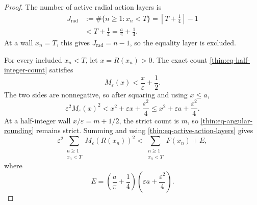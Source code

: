 \documentclass[11pt]{article}
\numberwithin{equation}{section}
\theoremstyle{definition}
\theoremstyle{remark}
\begin{document}
\begin{proof}
The number of active radial action layers is
\begin{equation}
\begin{aligned}
  J_{\mathrm{rad}}
  &:=\#\{n\geq1:x_n<T\}
    =\left\lceil T+\frac14\right\rceil-1 \\
  &<T+\frac14=\frac a\pi+\frac14.
\end{aligned}
  \label{thin:eq-active-action-layers}
\end{equation}
At a wall \(x_n=T\), this gives \(J_{\mathrm{rad}}=n-1\), so the equality
layer is excluded.

For every included \(x_n<T\), let \(x=R(x_n)>0\).  The exact count
\eqref{thin:eq-half-integer-count} satisfies
\[
  M_\varepsilon(x)<\frac{x}{\varepsilon}+\frac12.
\]
The two sides are nonnegative, so after squaring and using \(x\leq a\),
\begin{equation}
  \varepsilon^2M_\varepsilon(x)^2
  <x^2+\varepsilon x+\frac{\varepsilon^2}{4}
  \leq x^2+\varepsilon a+\frac{\varepsilon^2}{4}.
  \label{thin:eq-angular-rounding}
\end{equation}
At a half-integer wall \(x/\varepsilon=m+1/2\), the strict count is \(m\),
so \eqref{thin:eq-angular-rounding} remains strict.  Summing and using
\eqref{thin:eq-active-action-layers} gives
\begin{equation}
  \varepsilon^2
  \sum_{\substack{n\geq1\\x_n<T}}
    M_\varepsilon(R(x_n))^2
  <\sum_{\substack{n\geq1\\x_n<T}}F(x_n)+E,
  \label{thin:eq-complete-angular-error}
\end{equation}
where
\begin{equation}
  E=\left(\frac a\pi+\frac14\right)
     \left(\varepsilon a+\frac{\varepsilon^2}{4}\right).
  \label{thin:eq-angular-error}
\end{equation}


\end{proof}
\end{document}
